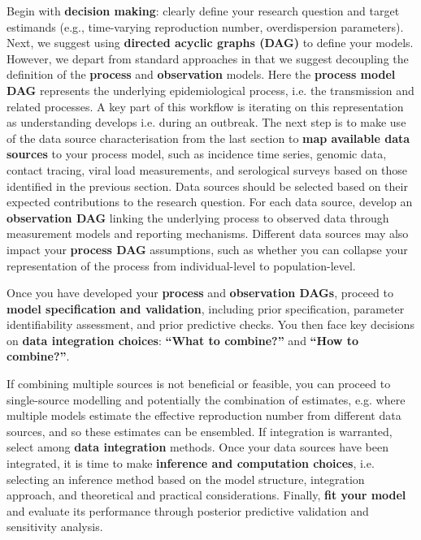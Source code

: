 \documentclass{article}
\begin{document}
Begin with \textbf{decision making}: clearly define your research question and target estimands (e.g., time-varying reproduction number, overdispersion parameters).
Next, we suggest using \textbf{directed acyclic graphs (DAG)}  to define your models. However, we depart from standard approaches in that we suggest decoupling the definition of the \textbf{process} and \textbf{observation} models.
Here the \textbf{process model DAG} represents the underlying epidemiological process, i.e. the transmission and related processes.
A key part of this workflow is iterating on this representation as understanding develops i.e. during an outbreak.
The next step is to make use of the data source characterisation from the last section to \textbf{map available \textbf{data sources} }to your process model, such as incidence time series, genomic data, contact tracing, viral load measurements, and serological surveys based on those identified in the previous section.
Data sources should be selected based on their expected contributions to the research question.
For each data source, develop an \textbf{observation DAG} linking the underlying process to observed data through measurement models and reporting mechanisms.
Different data sources may also impact your \textbf{process DAG} assumptions, such as whether you can collapse your representation of the process from individual-level to population-level.

Once you have developed your \textbf{process} and \textbf{observation DAGs}, proceed to \textbf{model specification and validation}, including prior specification, parameter identifiability assessment, and prior predictive checks.
You then face key decisions on \textbf{data integration choices}: \textbf{``What to combine?''} and \textbf{``How to combine?''}.

If combining multiple sources is not beneficial or feasible, you can proceed to single-source modelling and potentially the combination of estimates, e.g. where multiple models estimate the effective reproduction number from different data sources, and so these estimates can be ensembled.
If integration is warranted, select among \textbf{data integration} methods. 
Once your data sources have been integrated, it is time to make \textbf{inference and computation choices}, i.e. selecting an inference method based on the model structure, integration approach, and theoretical and practical considerations. 
Finally, \textbf{fit your model} and evaluate its performance through posterior predictive validation and sensitivity analysis.
\end{document}
